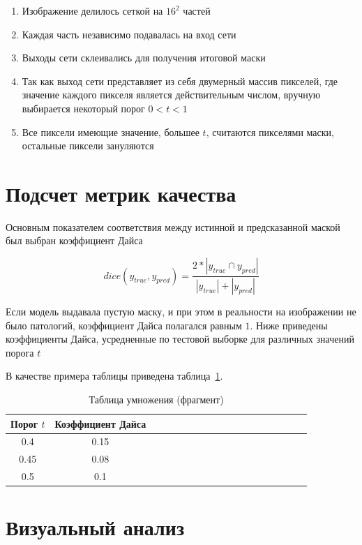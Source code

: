 \begin{enumerate}
    \item Изображение делилось сеткой на $16^2$ частей
    \item Каждая часть независимо подавалась на вход сети
    \item Выходы сети склеивались для получения итоговой маски
    \item Так как выход сети представляет из себя двумерный массив пикселей, где значение каждого пикселя является действительным числом, вручную выбирается некоторый порог $0 < t < 1$
    \item Все пиксели имеющие значение, большее $t$, считаются пикселями маски, остальные пиксели зануляются
\end{enumerate}



\section{Подсчет метрик качества}

Основным показателем соответствия между истинной и предсказанной маской был выбран коэффициент Дайса

$$ dice(y_{true}, y_{pred}) = \dfrac{2 * |y_{true} \cap y_{pred}|}{ |y_{true}| + |y_{pred}|} $$

Если модель выдавала пустую маску, и при этом в реальности на изображении не было патологий, коэффициент Дайса полагался равным $1$. Ниже приведены коэффициенты Дайса, усредненные по тестовой выборке для различных значений порога $t$ 

В качестве примера таблицы приведена таблица~\ref{tab1}.

\begin{table}[!h]
\caption{Таблица умножения (фрагмент)}\label{tab1}
\centering
\begin{tabular}{|*{18}{c|}}\hline
\textbf{Порог $t$} & \textbf{Коэффициент Дайса} \\\hline
0.4 & 0.15 \\\hline
0.45 & 0.08 \\\hline
0.5 & 0.1 \\\hline
\end{tabular}
\end{table}

\section{Визуальный анализ}

